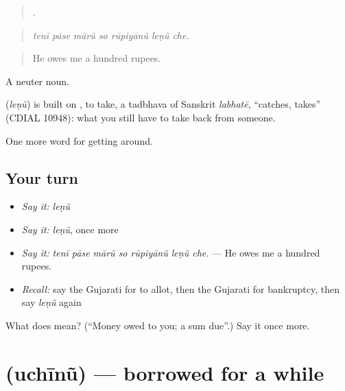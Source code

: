\begin{quote}
      .
\end{quote}

\begin{quote}
\emph{tenī pāse mārũ so rūpiyānũ leṇũ che.}
\end{quote}

\begin{quote}
He owes me a hundred rupees.
\end{quote}

A neuter noun.

\begin{cousinweb}
\textbf{} (\emph{leṇũ}) is built on , to take, a tadbhava of Sanskrit \emph{labhatē}, \textquotedblleft{}catches, takes\textquotedblright{} (CDIAL 10948): what you still have to take back from someone.
\end{cousinweb}

\begin{grammarlens}[title={What you've built}]
One more word for getting around.
\end{grammarlens}

\subsection*{Your turn}
\begin{itemize}
\raggedright
  \item \emph{Say it:} \emph{leṇũ}
  \item \emph{Say it:} \emph{leṇũ}, once more
  \item \emph{Say it:} \emph{tenī pāse mārũ so rūpiyānũ leṇũ che.} — He owes me a hundred rupees.
  \item \emph{Recall:} say the Gujarati for to allot, then the Gujarati for bankruptcy, then say \emph{leṇũ} again
\end{itemize}

\begin{tcolorbox}[breakable,colback=teal!4,colframe=teal!35!black,title={Before you move on}]
What does  mean? (\textquotedblleft{}Money owed to you; a sum due\textquotedblright{}.) Say it once more.
\end{tcolorbox}
\section[\texorpdfstring{\gu{ઉછીનું} (uchīnũ)}{ઉછીનું (uchīnũ)}]{ (uchīnũ) — borrowed for a while}

